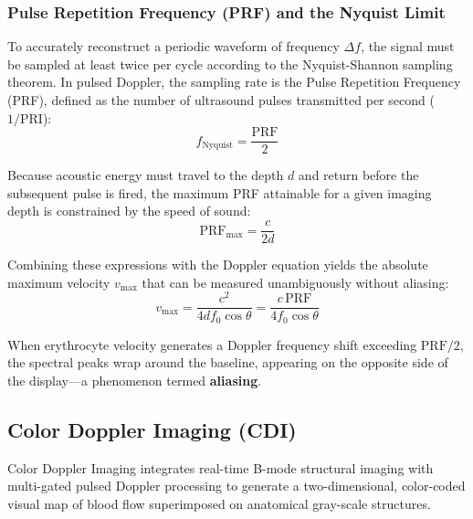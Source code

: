 \documentclass[11pt,a4paper]{article}
\begin{document}
\subsubsection{Pulse Repetition Frequency (PRF) and the Nyquist Limit}
To accurately reconstruct a periodic waveform of frequency $\Delta f$, the signal must be sampled at least twice per cycle according to the Nyquist-Shannon sampling theorem. In pulsed Doppler, the sampling rate is the Pulse Repetition Frequency (PRF), defined as the number of ultrasound pulses transmitted per second ($1/\text{PRI}$):
\begin{equation}
    f_{\text{Nyquist}} = \frac{\text{PRF}}{2}
\end{equation}

Because acoustic energy must travel to the depth $d$ and return before the subsequent pulse is fired, the maximum PRF attainable for a given imaging depth is constrained by the speed of sound:
\begin{equation}
    \text{PRF}_{\max} = \frac{c}{2 d}
\end{equation}

Combining these expressions with the Doppler equation yields the absolute maximum velocity $v_{\max}$ that can be measured unambiguously without aliasing:
\begin{equation}
    v_{\max} = \frac{c^2}{4 d f_0 \cos\theta} = \frac{c \, \text{PRF}}{4 f_0 \cos\theta}
\end{equation}

When erythrocyte velocity generates a Doppler frequency shift exceeding $\text{PRF}/2$, the spectral peaks wrap around the baseline, appearing on the opposite side of the display—a phenomenon termed \textbf{aliasing}.

\subsection{Color Doppler Imaging (CDI)}

Color Doppler Imaging integrates real-time B-mode structural imaging with multi-gated pulsed Doppler processing to generate a two-dimensional, color-coded visual map of blood flow superimposed on anatomical gray-scale structures.
\end{document}
